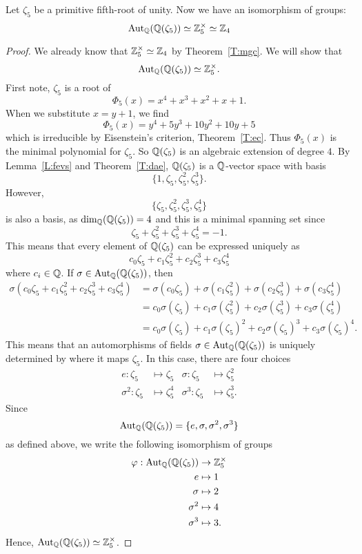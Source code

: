 \documentclass{ximera}
\begin{document}
\begin{example}[$\boldsymbol{\aut_{\pmb\Q}\pmb(\pmb\Q\pmb(\zeta_5\pmb)\pmb)}$]
  Let $\zeta_5$ be a primitive fifth-root of
  unity. Now we have an isomorphism of groups:
  \[
  \operatorname{Aut}_{\mathbb Q}(\mathbb Q(\zeta_5))\simeq\mathbb Z_5^\times\simeq \mathbb Z_4
  \]
  \begin{proof}
    We already know that $\mathbb Z_5^\times\simeq \mathbb Z_4$ by
    Theorem~\ref{T:mgc}. We will show that
    \[
    \operatorname{Aut}_{\mathbb Q}(\mathbb Q(\zeta_5))\simeq\mathbb Z_5^\times.
    \]
    First note, $\zeta_5$ is a root of
    \[
    \Phi_5(x) = x^4+x^3+x^2 + x + 1.
    \]
    When we substitute $x = y+ 1$, we find
    \[
    \Phi_5(x) = y^{4} +5y^3+10y^2+10y+5
    \]
    which is irreducible by Eisenstein's criterion,
    Theorem~\ref{T:ec}. Thus $\Phi_5(x)$ is the minimal polynomial for
    $\zeta_5$.  So $\mathbb Q(\zeta_5)$ is an algebraic extension of degree
    $4$.  By Lemma~\ref{L:fevs} and Theorem~\ref{T:dae}, $\mathbb Q(\zeta_5)$
    is a $\mathbb Q$-vector space with basis
    \[
    \{1,\zeta_5,\zeta_5^2,\zeta_5^3\}.
    \]
    However,
    \[
    \{\zeta_5,\zeta_5^2,\zeta_5^3,\zeta_5^4\}
    \]
    is also a basis, as $\dim_\mathbb Q(\mathbb Q(\zeta_5))=4$ and this is a minimal
    spanning set since
    \[
    \zeta_5 + \zeta_5^2  + \zeta_5^3 + \zeta_5^4 = -1.
    \]
    This means that every element of $\mathbb Q(\zeta_5)$ can be expressed
    uniquely as
    \[
    c_0\zeta_5 + c_1\zeta_5^2  + c_2\zeta_5^3 + c_3\zeta_5^4 
    \]
    where $c_i\in\mathbb Q$. If $\sigma\in\operatorname{Aut}_\mathbb Q(\mathbb Q(\zeta_5))$, then
    \begin{align*}
      \sigma(c_0\zeta_5 + c_1\zeta_5^2  + c_2\zeta_5^3 + c_3\zeta_5^4) &= \sigma(c_0\zeta_5) + \sigma(c_1 \zeta_5^2)+ \sigma(c_2 \zeta_5^3)+ \sigma(c_3 \zeta_5^4)\\
      &= c_0 \sigma(\zeta_5) + c_1 \sigma(\zeta_5^2) + c_2 \sigma(\zeta_5^3) + c_3 \sigma(\zeta_5^4)\\
      &= c_0 \sigma(\zeta_5) + c_1 \sigma(\zeta_5)^2 + c_2 \sigma(\zeta_5)^3 + c_3 \sigma(\zeta_5)^4.
    \end{align*}
    This means that an automorphisms of fields $\sigma \in
    \operatorname{Aut}_\mathbb Q(\mathbb Q(\zeta_5))$ is uniquely determined by where it maps
    $\zeta_5$. In this case, there are four choices
    \begin{align*}
      e :\zeta_5 &\mapsto \zeta_5 &  \sigma :\zeta_5 &\mapsto \zeta_5^2\\
      \sigma^2 :\zeta_5 &\mapsto \zeta_5^4 &  \sigma^3 :\zeta_5 &\mapsto \zeta_5^3.
    \end{align*}
    Since
    \[
    \operatorname{Aut}_\mathbb Q(\mathbb Q(\zeta_5)) = \{e,\sigma,\sigma^2,\sigma^3\}
    \]
    as defined above, we write the following isomorphism of groups
    \begin{align*}
      \varphi: \operatorname{Aut}_\mathbb Q(\mathbb Q(\zeta_5)) &\to \mathbb Z_5^\times\\
      e &\mapsto 1\\
      \sigma &\mapsto 2\\
      \sigma^2 &\mapsto 4\\
      \sigma^3 &\mapsto 3.\\
    \end{align*}
    Hence, $\operatorname{Aut}_\mathbb Q(\mathbb Q(\zeta_5))\simeq\mathbb Z_5^\times$.
  \end{proof}
\end{example}
\end{document}
